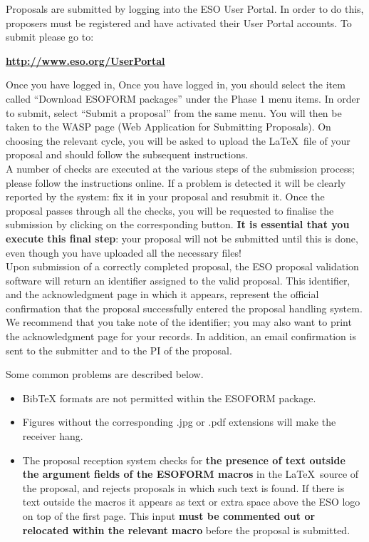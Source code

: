 \documentclass{article}
\begin{document}
Proposals are submitted by logging into the ESO User Portal.
In order to do this, proposers must be registered and have activated
their User Portal accounts. To submit please go to:
\begin{center}
  \href{http://www.eso.org/UserPortal}{\bf \underline{http://www.eso.org/UserPortal}}
\end{center}
Once you have logged in, Once you have logged in, you should select the item called ``Download ESOFORM packages'' under the Phase 1 menu items.  In order to submit, select ``Submit a proposal'' from the same menu. You will then be taken to the WASP page (Web Application for Submitting Proposals). 
On choosing the relevant cycle, you will be asked to upload the \LaTeX\ file of your proposal and should follow the subsequent instructions. \\
A number
of checks are executed at the various steps of the submission process;
please follow the instructions online. If a problem is detected 
it will be clearly reported by the system: fix it in your proposal and
resubmit it.
Once the proposal passes through all the checks, you will be requested to finalise the
submission by clicking on the corresponding button. {\bf It is
  essential that you execute this final step}: your proposal will not
be submitted until this is done, even though you have uploaded all the
necessary files! \\
 Upon submission of
a correctly completed proposal, the ESO proposal validation
software will return an identifier assigned to the valid proposal. This
identifier, and the acknowledgment page in which it appears, represent
the official confirmation that the proposal successfully entered the
proposal handling system. We recommend that you take note of the
identifier; you may also want to print the acknowledgment page for
your records. In addition, an email confirmation
is sent to the submitter and to the PI of the proposal.


Some common problems are described below.
\begin{itemize}
\item BibTeX formats are not permitted within the ESOFORM package.
\item Figures without the corresponding .jpg or .pdf extensions will make the receiver hang.
\item The proposal reception system checks for {\bf the presence of text outside
 the argument fields of the ESOFORM macros} in the \LaTeX\ source of
the proposal, and rejects proposals in which such text is
found. If there is text outside the macros it appears as text or extra space above 
the ESO logo on top of the first page.  
This input {\bf must be commented out or relocated within the relevant macro} before the proposal is
submitted. 

\end{itemize}
\end{document}
